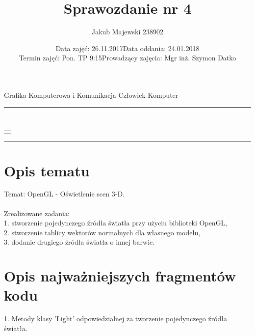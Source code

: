 \documentclass[a4paper,11pt]{article}
\date{
{Data zajęć: 26.11.2017\hfill Data oddania: 24.01.2018}
\\
{Termin zajęć: Pon. TP 9:15\hfill Prowadzący zajęcia: Mgr inż. Szymon Datko}
}
\title{Sprawozdanie nr 4}
\author{Jakub Majewski 238902}
\makeatletter
\renewcommand{\maketitle}{
   \begin{titlepage}
     \begin{center}
       {\@date}
       \\
       \par\vspace{3ex}
       {\LARGE\@title}
       \par\vspace{1ex}
       \begin{tabular}[t]{c}
         \@author
       \end{tabular}
     \end{center}
     \@thanks
   \end{titlepage}
}
\makeatother
\begin{document}
\begin{center}\Large
    Grafika Komputerowa i Komunikacja Człowiek-Komputer
\end{center}

\hrule
    {\let\newpage\relax\maketitle}
\hrule

\section{Opis tematu}

Temat: OpenGL - Oświetlenie scen 3-D. \\ \\
Zrealizowane zadania: \\
1. stworzenie pojedynczego źródła światła przy użyciu biblioteki OpenGL, \\
2. stworzenie tablicy wektorów normalnych dla własnego modelu, \\
3. dodanie drugiego źródła światła o innej barwie. \\

\newpage
\section{Opis najważniejszych fragmentów kodu}

1. Metody klasy 'Light' odpowiedzialnej za tworzenie pojedynczego źródła światła.
\end{document}
